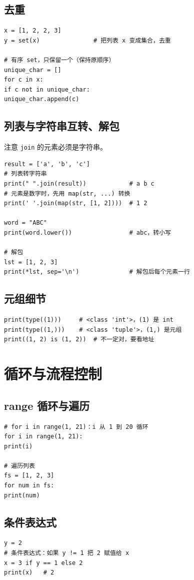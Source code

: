\documentclass{article}
\begin{document}
\subsection{去重}
\begin{lstlisting}
x = [1, 2, 2, 3]
y = set(x)               # 把列表 x 变成集合，去重

# 有序 set，只保留一个（保持原顺序）
unique_char = []
for c in x:
if c not in unique_char:
unique_char.append(c)
\end{lstlisting}

\subsection{列表与字符串互转、解包}
注意 \texttt{join} 的元素必须是字符串。
\begin{lstlisting}
result = ['a', 'b', 'c']
# 列表转字符串
print(" ".join(result))            # a b c
# 元素是数字时，先用 map(str, ...) 转换
print(' '.join(map(str, [1, 2])))  # 1 2

word = "ABC"
print(word.lower())                # abc，转小写

# 解包
lst = [1, 2, 3]
print(*lst, sep='\n')              # 解包后每个元素一行
\end{lstlisting}

\subsection{元组细节}
\begin{lstlisting}
print(type((1)))     # <class 'int'>，(1) 是 int
print(type((1,)))    # <class 'tuple'>，(1,) 是元组
print((1, 2) is (1, 2))  # 不一定对，要看地址
\end{lstlisting}

\section{循环与流程控制}
\subsection{range 循环与遍历}
\begin{lstlisting}
# for i in range(1, 21)：i 从 1 到 20 循环
for i in range(1, 21):
print(i)

# 遍历列表
fs = [1, 2, 3]
for num in fs:
print(num)
\end{lstlisting}

\subsection{条件表达式}
\begin{lstlisting}
y = 2
# 条件表达式：如果 y != 1 把 2 赋值给 x
x = 3 if y == 1 else 2
print(x)   # 2
\end{lstlisting}
\end{document}
